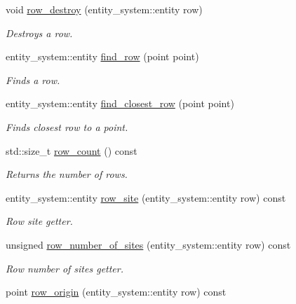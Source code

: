 \begin{DoxyCompactItemize}
\item 
void \hyperlink{classophidian_1_1floorplan_1_1floorplan_a7da67760eb6ed9dcfaa64586620cb1f2}{row\-\_\-destroy} (entity\-\_\-system\-::entity row)
\begin{DoxyCompactList}\small\item\em Destroys a row. \end{DoxyCompactList}\item 
entity\-\_\-system\-::entity \hyperlink{classophidian_1_1floorplan_1_1floorplan_a30675071a626b20eb3406e4ea2c851c6}{find\-\_\-row} (point point)
\begin{DoxyCompactList}\small\item\em Finds a row. \end{DoxyCompactList}\item 
entity\-\_\-system\-::entity \hyperlink{classophidian_1_1floorplan_1_1floorplan_a1b58f8ddb6bbf4bd75daa9bac6809512}{find\-\_\-closest\-\_\-row} (point point)
\begin{DoxyCompactList}\small\item\em Finds closest row to a point. \end{DoxyCompactList}\item 
std\-::size\-\_\-t \hyperlink{classophidian_1_1floorplan_1_1floorplan_a885d82c7486f55f0954503e29b30302a}{row\-\_\-count} () const 
\begin{DoxyCompactList}\small\item\em Returns the number of rows. \end{DoxyCompactList}\item 
entity\-\_\-system\-::entity \hyperlink{classophidian_1_1floorplan_1_1floorplan_a850984ae945451bdfa6394bc305e27cc}{row\-\_\-site} (entity\-\_\-system\-::entity row) const 
\begin{DoxyCompactList}\small\item\em Row site getter. \end{DoxyCompactList}\item 
unsigned \hyperlink{classophidian_1_1floorplan_1_1floorplan_a4eec1b05b06d362e9aeadda9515715c1}{row\-\_\-number\-\_\-of\-\_\-sites} (entity\-\_\-system\-::entity row) const 
\begin{DoxyCompactList}\small\item\em Row number of sites getter. \end{DoxyCompactList}\item 
point \hyperlink{classophidian_1_1floorplan_1_1floorplan_aa74ac1838e4bae0e8820774f2d5c4cff}{row\-\_\-origin} (entity\-\_\-system\-::entity row) const 

\end{DoxyCompactItemize}
